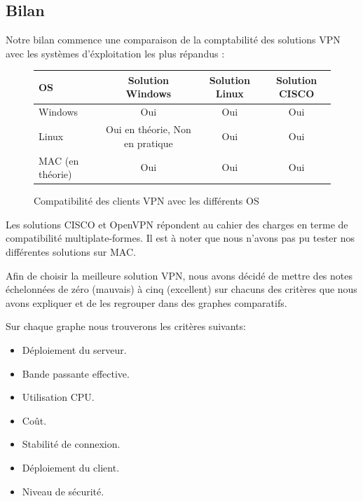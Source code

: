 \subsection{Bilan}

Notre bilan commence une comparaison de la comptabilité des solutions VPN avec les systèmes d'éxploitation les plus répandus :

\begin{figure}[H]
	\begin{center}
\begin{tabular}{l|c|c|c}
OS & Solution Windows & Solution Linux & Solution CISCO \\
\hline
Windows & Oui & Oui & Oui \\
Linux & Oui en théorie, Non en pratique & Oui & Oui \\
MAC (en théorie) & Oui & Oui & Oui \\
\end{tabular}
	\end{center}
	\caption{Compatibilité des clients VPN avec les différents OS}
	\label{Compatibilité_des_OS}
\end{figure}

Les solutions CISCO et OpenVPN répondent au cahier des charges en terme de compatibilité multiplate-formes. Il est à noter que nous n'avons pas pu tester nos différentes solutions sur MAC.

Afin de choisir la meilleure solution VPN, nous avons décidé de mettre des notes échelonnées de zéro (mauvais) à cinq (excellent) sur chacuns des critères que nous avons expliquer et de les regrouper dans des graphes comparatifs.

Sur chaque graphe nous trouverons les critères suivants:
\begin{itemize}
 	\item Déploiement du serveur.
 	\item Bande passante effective.
 	\item Utilisation CPU.
 	\item Coût.
 	\item Stabilité de connexion.
 	\item Déploiement du client.
	\item Niveau de sécurité.
\end{itemize}

